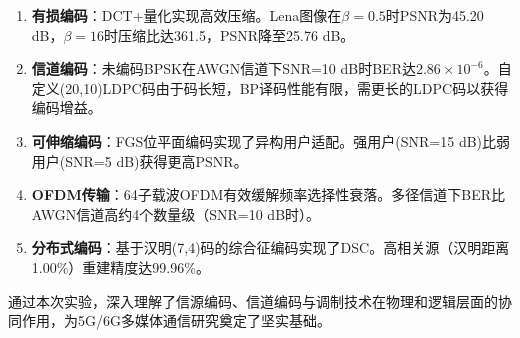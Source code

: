 \documentclass[12pt, a4paper]{article}
\begin{document}
\begin{enumerate}
    \item \textbf{有损编码}：DCT+量化实现高效压缩。Lena图像在$\beta=0.5$时PSNR为45.20 dB，$\beta=16$时压缩比达361.5，PSNR降至25.76 dB。
    \item \textbf{信道编码}：未编码BPSK在AWGN信道下SNR=10 dB时BER达$2.86\times10^{-6}$。自定义(20,10)LDPC码由于码长短，BP译码性能有限，需更长的LDPC码以获得编码增益。
    \item \textbf{可伸缩编码}：FGS位平面编码实现了异构用户适配。强用户(SNR=15 dB)比弱用户(SNR=5 dB)获得更高PSNR。
    \item \textbf{OFDM传输}：64子载波OFDM有效缓解频率选择性衰落。多径信道下BER比AWGN信道高约4个数量级（SNR=10 dB时）。
    \item \textbf{分布式编码}：基于汉明(7,4)码的综合征编码实现了DSC。高相关源（汉明距离1.00\%）重建精度达99.96\%。
\end{enumerate}

通过本次实验，深入理解了信源编码、信道编码与调制技术在物理和逻辑层面的协同作用，为5G/6G多媒体通信研究奠定了坚实基础。
\end{document}
